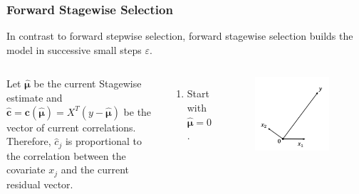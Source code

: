 \begin{frame}
\frametitle{Forward Stagewise Selection}
In contrast to forward stepwise selection, forward stagewise selection builds the model in successive small steps $\varepsilon$.

\begin{columns}[t]
    Let $\hat{\mathbf{\mu}}$ be the current Stagewise estimate and $\hat{\mathbf{c}}=\mathbf{c}(\hat{\mathbf{\mu}})=X^T(y-\hat{\mathbf{\mu}})$ be the vector of current correlations. Therefore, $\hat{c}_j$ is proportional to the correlation between the covariate $x_j$ and the current residual vector.
    \begin{enumerate}
        \item Start with $\hat{\mathbf{\mu}}=0$.
    \end{enumerate}
    
    \begin{figure}[!htbp]
        \begin{center}
            \includegraphics[width=0.9\textwidth]{img/FStageR/1.jpeg}
        \end{center}
    \end{figure}
\end{columns}
\end{frame}

